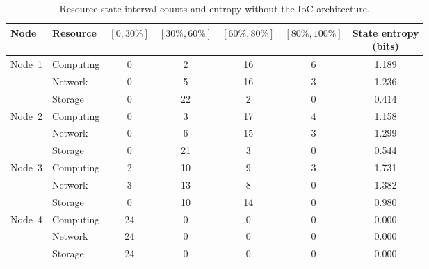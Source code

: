 \documentclass{ccjnl}
\begin{document}
\begin{table}[!t]
	\centering
	\caption{Resource-state interval counts and entropy without the IoC architecture.}
	\label{tab:inference-state-baseline}
	\scriptsize
	\setlength{\tabcolsep}{5pt}
	\renewcommand{\arraystretch}{1.08}
	\begin{tabular*}{\textwidth}{@{\extracolsep{\fill}}llccccc@{}}
		\toprule
		\textbf{Node} & \textbf{Resource}
		& \textbf{$[0,30\%]$}
		& \textbf{$[30\%,60\%]$}
		& \textbf{$[60\%,80\%]$}
		& \textbf{$[80\%,100\%]$}
		& \makecell[c]{\textbf{State entropy}\\\textbf{(bits)}} \\
		\midrule
		\multirow{3}{*}{Node~1}
		& Computing & 0 & 2  & 16 & 6 & 1.189 \\
		& Network   & 0 & 5  & 16 & 3 & 1.236 \\
		& Storage   & 0 & 22 & 2  & 0 & 0.414 \\
		\midrule
		\multirow{3}{*}{Node~2}
		& Computing & 0 & 3  & 17 & 4 & 1.158 \\
		& Network   & 0 & 6  & 15 & 3 & 1.299 \\
		& Storage   & 0 & 21 & 3  & 0 & 0.544 \\
		\midrule
		\multirow{3}{*}{Node~3}
		& Computing & 2 & 10 & 9  & 3 & 1.731 \\
		& Network   & 3 & 13 & 8  & 0 & 1.382 \\
		& Storage   & 0 & 10 & 14 & 0 & 0.980 \\
		\midrule
		\multirow{3}{*}{Node~4}
		& Computing & 24 & 0 & 0 & 0 & 0.000 \\
		& Network   & 24 & 0 & 0 & 0 & 0.000 \\
		& Storage   & 24 & 0 & 0 & 0 & 0.000 \\
		\bottomrule
	\end{tabular*}
\end{table}
\end{document}
